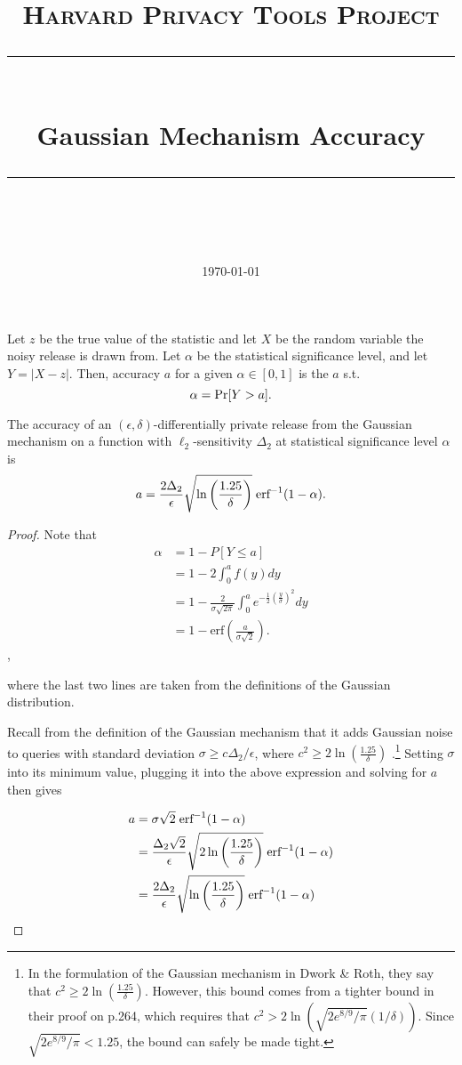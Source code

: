 \documentclass[11pt]{scrartcl} %
\title{
	\normalfont\normalsize
	\textsc{Harvard Privacy Tools Project}\\ %
	\vspace{25pt} %
	\rule{\linewidth}{0.5pt}\\ %
	\vspace{20pt} %
	{\huge Gaussian Mechanism Accuracy}\\ %
	\vspace{12pt} %
	\rule{\linewidth}{2pt}\\ %
	\vspace{12pt} %
}
\date{\normalsize\today} %
\begin{document}
\maketitle

\begin{definition}
Let $z$ be the true value of the statistic and let $X$ be the random variable the noisy release is drawn from. Let $\alpha$ be the statistical significance level, and let $Y = \vert X-z \vert.$ Then, accuracy $a$ for a given $\alpha \in [0,1]$ is the $a$ s.t.
$$ \alpha = \text{Pr}[Y > a].$$
\end{definition}

\begin{theorem}
The accuracy of an $(\epsilon,\delta)$-differentially private release from the Gaussian mechanism on a function with $\ell_2$-sensitivity $\Delta_2$ at statistical significance level $\alpha$ is
$$ a = \frac{2 \Delta_2}{\epsilon} \sqrt{\ln \left( \frac{1.25}{\delta} \right)} \hspace{0.1cm} \text{erf}^{-1} (1 - \alpha).$$
\end{theorem}

\begin{proof}
Note that
\begin{align*}
\alpha &= 1 - P[Y \le a] \\
	&= 1 - 2 \int_0^a f(y) dy \\
	&= 1 - \frac{2}{\sigma \sqrt{2\pi}} \int_0^a e^{-\frac{1}{2}\left( \frac{y}{\sigma}\right)^2} dy \\
	&= 1 - \text{erf}\left( \frac{a}{\sigma \sqrt{2}}\right).
\end{align*},

where the last two lines are taken from the definitions of the Gaussian distribution.

Recall from the definition of the Gaussian mechanism that it adds Gaussian noise to queries with standard deviation
$\sigma \ge c \Delta_2 / \epsilon$, where $c^2 \ge 2 \ln \left( \frac{1.25}{\delta} \right)$ \cite{DR14}.\footnote{In the formulation of the Gaussian mechanism in Dwork \& Roth, they say that $c^2 \ge 2 \ln \left( \frac{1.25}{\delta} \right)$. However, this bound comes from a tighter bound in their proof on p.264, which requires that $c^2 > 2 \ln (\sqrt{2 e^{8/9}/\pi}(1/\delta))$. Since $\sqrt{2 e^{8/9}/\pi} < 1.25$, the bound can safely be made tight.} Setting $\sigma$ into its minimum value, plugging it into the above expression and solving for $a$ then gives

\begin{align*}
a &= \sigma \sqrt{2} \hspace{0.1cm} \text{erf}^{-1} (1 - \alpha)\\
	&= \frac{\Delta_2 \sqrt{2}}{\epsilon} \sqrt{ 2 \ln \left( \frac{1.25}{\delta} \right)} \hspace{0.1cm} \text{erf}^{-1} (1 - \alpha)\\
	&= \frac{2 \Delta_2}{\epsilon} \sqrt{\ln \left( \frac{1.25}{\delta} \right)} \hspace{0.1cm} \text{erf}^{-1} (1 - \alpha)
\end{align*}
\end{proof}



\end{document}
